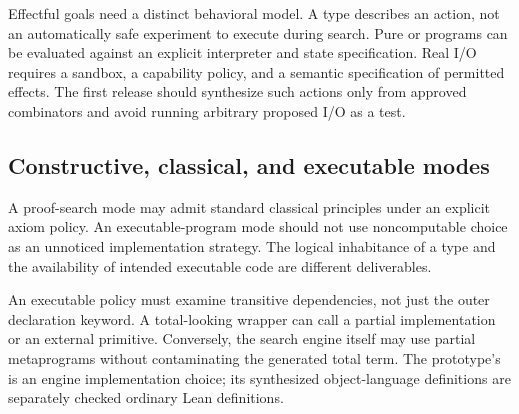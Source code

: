 Effectful goals need a distinct behavioral model. A type  describes an action, not an automatically safe experiment to execute during search. Pure  or  programs can be evaluated against an explicit interpreter and state specification. Real I/O requires a sandbox, a capability policy, and a semantic specification of permitted effects. The first release should synthesize such actions only from approved combinators and avoid running arbitrary proposed I/O as a test.

\subsection{Constructive, classical, and executable modes}

A proof-search mode may admit standard classical principles under an explicit axiom policy. An executable-program mode should not use noncomputable choice as an unnoticed implementation strategy. The logical inhabitance of a type and the availability of intended executable code are different deliverables.

An executable policy must examine transitive dependencies, not just the outer declaration keyword. A total-looking wrapper can call a partial implementation or an external primitive. Conversely, the search engine itself may use partial metaprograms without contaminating the generated total term. The prototype's  is an engine implementation choice; its synthesized object-language definitions are separately checked ordinary Lean definitions.
